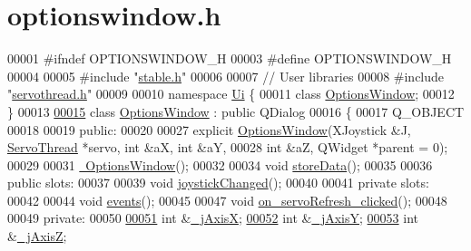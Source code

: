 \hypertarget{a00019_source}{}\section{optionswindow.\+h}

\begin{DoxyCode}
00001 \textcolor{preprocessor}{#ifndef OPTIONSWINDOW\_H}
00003 \textcolor{preprocessor}{#define OPTIONSWINDOW\_H}
00004 
00005 \textcolor{preprocessor}{#include "\hyperlink{a00022}{stable.h}"}
00006 
00007 \textcolor{comment}{// User libraries}
00008 \textcolor{preprocessor}{#include "\hyperlink{a00021}{servothread.h}"}
00009 
00010 \textcolor{keyword}{namespace }\hyperlink{a00024}{Ui} \{
00011 \textcolor{keyword}{class }\hyperlink{a00006}{OptionsWindow};
00012 \}
00013 
\hypertarget{a00019_source_l00015}{}\hyperlink{a00006}{00015} \textcolor{keyword}{class }\hyperlink{a00006}{OptionsWindow} : \textcolor{keyword}{public} QDialog
00016 \{
00017     Q\_OBJECT
00018     
00019 \textcolor{keyword}{public}:
00020     
00027     \textcolor{keyword}{explicit} \hyperlink{a00006_a968da93eec85561ebdb3a464eff15611}{OptionsWindow}(XJoystick &J, \hyperlink{a00008}{ServoThread} *servo, \textcolor{keywordtype}{int} &aX, \textcolor{keywordtype}{int} &aY, 
00028                            \textcolor{keywordtype}{int} &aZ, QWidget *parent = 0);
00029     
00031     \hyperlink{a00006_a034c885fe8bb4416e732a9571d14a6b4}{~OptionsWindow}();
00032     
00034     \textcolor{keywordtype}{void} \hyperlink{a00006_ab0a56ad7347c20046602a7a2a1c83397}{storeData}();
00035     
00036 \textcolor{keyword}{public} slots:
00037     
00039     \textcolor{keywordtype}{void} \hyperlink{a00006_ae8c0373be58da710194f8d14f1c3c4dc}{joystickChanged}();
00040 
00041 \textcolor{keyword}{private} slots:
00042     
00044     \textcolor{keywordtype}{void} \hyperlink{a00006_a18763ff318688083c7ee5a21f22e8e98}{events}();
00045     
00047     \textcolor{keywordtype}{void} \hyperlink{a00006_ad5365d452e8bcd86cbb64b9ec42c3b7e}{on\_servoRefresh\_clicked}();
00048     
00049 \textcolor{keyword}{private}:
00050     
\hypertarget{a00019_source_l00051}{}\hyperlink{a00006_a01d6284355011203ee6e8856a0bdf557}{00051}     \textcolor{keywordtype}{int} &\hyperlink{a00006_a01d6284355011203ee6e8856a0bdf557}{\_jAxisX};   
\hypertarget{a00019_source_l00052}{}\hyperlink{a00006_a8921d1cc5bcb527466c28feb5dcc59b1}{00052}     \textcolor{keywordtype}{int} &\hyperlink{a00006_a8921d1cc5bcb527466c28feb5dcc59b1}{\_jAxisY};   
\hypertarget{a00019_source_l00053}{}\hyperlink{a00006_a47409f50a87942706baaea3d025785e3}{00053}     \textcolor{keywordtype}{int} &\hyperlink{a00006_a47409f50a87942706baaea3d025785e3}{\_jAxisZ};   

\end{DoxyCode}
